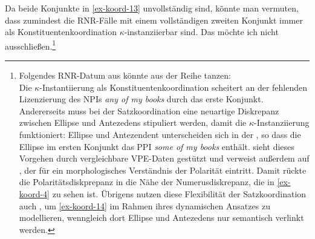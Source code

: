 Da beide Konjunkte in \ref{ex-koord-13} unvollständig sind, könnte man vermuten, dass zumindest die RNR-Fälle mit einem vollständigen zweiten Konjunkt immer als Konstituentenkoordination $\kappa$-instanziierbar sind. Das möchte ich nicht ausschlie\ss en.\footnote{Folgendes RNR-Datum aus \citet[(23a)]{Cann:etal:05b} könnte aus der Reihe tanzen:\\
Die $\kappa$-Instantiierung als Konstituentenkoordination scheitert an der fehlenden Lizenzierung des NPIs {\it any of my books} durch das erste Konjunkt. Andererseits muss bei der Satzkoordination eine neuartige Diskrepanz zwischen Ellipse und Antezedens stipuliert werden, damit die $\kappa$-Instanziierung funktioniert: Ellipse und Antezendent unterscheiden sich in der , so dass die Ellipse im ersten Konjunkt das PPI {\it some of my books} enthält. \citet[81f]{Ha:08} sieht dieses Vorgehen durch vergleichbare VPE-Daten gestützt und verweist au\ss erdem auf \cite{Klima:64}, der für ein morphologisches Verständnis der Polarität eintritt. Damit rückte die Polaritätsdiskprepanz in die Nähe der Numerusdiskrepanz, die in \ref{ex-koord-4} zu sehen ist. Übrigens nutzen diese Flexibilität der Satzkoordination auch \cite{Cann:etal:05b}, um \ref{ex-koord-14} im Rahmen ihres dynamischen Ansatzes zu modellieren, wenngleich dort Ellipse und Antezedens nur semantisch verlinkt werden.
}

